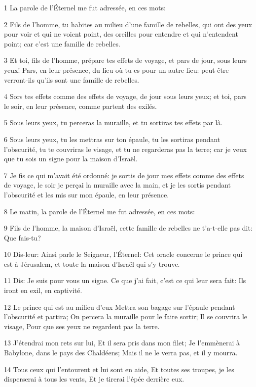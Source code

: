 \par 1 La parole de l'Éternel me fut adressée, en ces mots:
\par 2 Fils de l'homme, tu habites au milieu d'une famille de rebelles, qui ont des yeux pour voir et qui ne voient point, des oreilles pour entendre et qui n'entendent point; car c'est une famille de rebelles.
\par 3 Et toi, fils de l'homme, prépare tes effets de voyage, et pars de jour, sous leurs yeux! Pars, en leur présence, du lieu où tu es pour un autre lieu: peut-être verront-ils qu'ils sont une famille de rebelles.
\par 4 Sors tes effets comme des effets de voyage, de jour sous leurs yeux; et toi, pars le soir, en leur présence, comme partent des exilés.
\par 5 Sous leurs yeux, tu perceras la muraille, et tu sortiras tes effets par là.
\par 6 Sous leurs yeux, tu les mettras sur ton épaule, tu les sortiras pendant l'obscurité, tu te couvriras le visage, et tu ne regarderas pas la terre; car je veux que tu sois un signe pour la maison d'Israël.
\par 7 Je fis ce qui m'avait été ordonné: je sortis de jour mes effets comme des effets de voyage, le soir je perçai la muraille avec la main, et je les sortis pendant l'obscurité et les mis sur mon épaule, en leur présence.
\par 8 Le matin, la parole de l'Éternel me fut adressée, en ces mots:
\par 9 Fils de l'homme, la maison d'Israël, cette famille de rebelles ne t'a-t-elle pas dit: Que fais-tu?
\par 10 Dis-leur: Ainsi parle le Seigneur, l'Éternel: Cet oracle concerne le prince qui est à Jérusalem, et toute la maison d'Israël qui s'y trouve.
\par 11 Dis: Je suis pour vous un signe. Ce que j'ai fait, c'est ce qui leur sera fait: Ils iront en exil, en captivité.
\par 12 Le prince qui est au milieu d'eux Mettra son bagage sur l'épaule pendant l'obscurité et partira; On percera la muraille pour le faire sortir; Il se couvrira le visage, Pour que ses yeux ne regardent pas la terre.
\par 13 J'étendrai mon rets sur lui, Et il sera pris dans mon filet; Je l'emmènerai à Babylone, dans le pays des Chaldéens; Mais il ne le verra pas, et il y mourra.
\par 14 Tous ceux qui l'entourent et lui sont en aide, Et toutes ses troupes, je les disperserai à tous les vents, Et je tirerai l'épée derrière eux.
